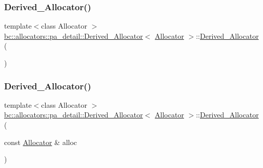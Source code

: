 \subsubsection{\texorpdfstring{Derived\+\_\+\+Allocator()}{Derived\_Allocator()}\hspace{0.1cm}{\footnotesize\ttfamily [1/3]}}
{\footnotesize\ttfamily template$<$class Allocator $>$ \\
\hyperlink{structbc_1_1allocators_1_1pa__detail_1_1Derived__Allocator}{bc\+::allocators\+::pa\+\_\+detail\+::\+Derived\+\_\+\+Allocator}$<$ \hyperlink{classbc_1_1allocators_1_1Allocator}{Allocator} $>$\+::\hyperlink{structbc_1_1allocators_1_1pa__detail_1_1Derived__Allocator}{Derived\+\_\+\+Allocator} (\begin{DoxyParamCaption}{ }\end{DoxyParamCaption})\hspace{0.3cm}{\ttfamily [inline]}}

\mbox{\label{structbc_1_1allocators_1_1pa__detail_1_1Derived__Allocator_a72853b8b5e37a81c2f766d8dab779153}} 
\subsubsection{\texorpdfstring{Derived\+\_\+\+Allocator()}{Derived\_Allocator()}\hspace{0.1cm}{\footnotesize\ttfamily [2/3]}}
{\footnotesize\ttfamily template$<$class Allocator $>$ \\
\hyperlink{structbc_1_1allocators_1_1pa__detail_1_1Derived__Allocator}{bc\+::allocators\+::pa\+\_\+detail\+::\+Derived\+\_\+\+Allocator}$<$ \hyperlink{classbc_1_1allocators_1_1Allocator}{Allocator} $>$\+::\hyperlink{structbc_1_1allocators_1_1pa__detail_1_1Derived__Allocator}{Derived\+\_\+\+Allocator} (\begin{DoxyParamCaption}\item[{const \hyperlink{classbc_1_1allocators_1_1Allocator}{Allocator} \&}]{alloc }\end{DoxyParamCaption})\hspace{0.3cm}{\ttfamily [inline]}}

